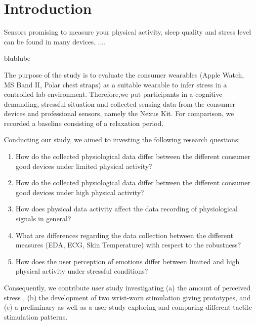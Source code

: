 \section{Introduction}

Sensors promising to measure your physical activity, sleep quality and stress level can be found in many devices. ....  

blublube



The purpose of the study is to evaluate the consumer wearables (Apple Watch, MS Band II, Polar chest straps) as a suitable wearable to infer stress in a controlled lab environment. Therefore,we put participants in a cognitive demanding, stressful situation and collected sensing data from the consumer devices and professional sensors, namely the Nexus Kit. For comparison, we recorded a baseline consisting of a relaxation period. 

Conducting our study, we aimed to investing the following research questions:
\begin{enumerate}
	\item How do the collected physiological data differ between the different consumer good devices under limited physical activity?
	\item How do the collected physiological data differ between the different consumer good devices under high physical activity?
	\item How does physical data activity affect the data recording of physiological signals in general? 
	\item What are differences regarding the data collection between the different measures (EDA, ECG, Skin Temperature) with respect to the robustness?
	\item How does the user perception of emotions differ between limited and high physical activity under stressful conditions?  
\end{enumerate}

Consequently, we contribute user study investigating (a) the amount of perceived stress , (b) the development of two wrist-worn stimulation giving prototypes, and (c) a preliminary as well as a user study exploring and comparing different tactile stimulation patterns.


 


